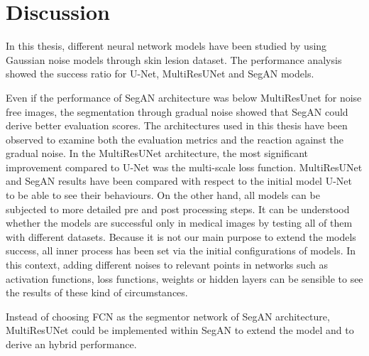 \chapter{Discussion}
\thispagestyle{empty}

    In this thesis, different neural network models have been studied by using Gaussian noise models through skin lesion dataset.
    The performance analysis showed the success ratio for U-Net, MultiResUNet and SegAN models.

    Even if the performance of SegAN architecture was below MultiResUnet for noise free images,
    the segmentation through gradual noise showed that SegAN could derive better evaluation scores.
    The architectures used in this thesis have been observed to examine both the evaluation metrics and the reaction against the gradual noise.
    In the MultiResUNet architecture, the most significant improvement compared to U-Net was the multi-scale loss function.
    MultiResUNet and SegAN results have been compared with respect to the initial model U-Net to be able to see their behaviours.
    On the other hand, all models can be subjected to more detailed pre and post processing steps.
    It can be understood whether the models are successful only in medical images by testing all of them with different datasets.
    Because it is not our main purpose to extend the models success, all inner process has been set via the initial configurations of models.
    In this context, adding different noises to relevant points in networks such as
    activation functions, loss functions, weights or hidden layers can be sensible to see the results of these kind of circumstances.

    Instead of choosing FCN as the segmentor network of SegAN architecture,
    MultiResUNet could be implemented within SegAN to extend the model and to derive an hybrid performance.